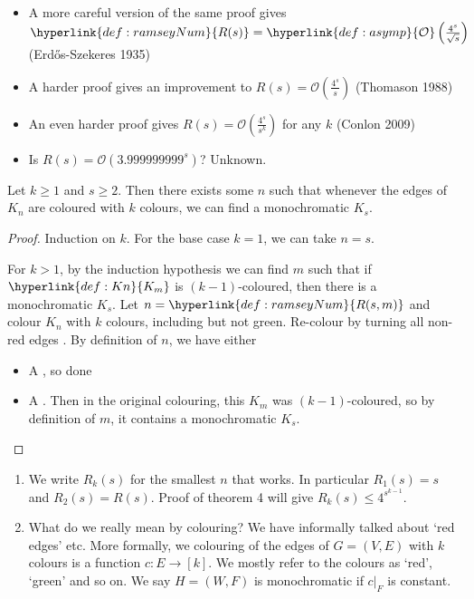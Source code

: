 \documentclass{article}
\begin{document}
\begin{remark}
    \leavevmode
    \begin{itemize}
        \item A more careful version of the same proof gives $\hyperlink{def:ramseyNum}{R(s)} = \hyperlink{def:asymp}{\mathcal{O}} \left(\frac{4^s}{\sqrt{s}}\right)$ (Erd\H{o}s-Szekeres 1935)
        \item A harder proof gives an improvement to $R(s) = \mathcal{O}\left(\frac{4^s}{s}\right)$ (Thomason 1988)
        \item An even harder proof gives $R(s) = \mathcal{O}\left(\frac{4^s}{s^k}\right)$ for any $k$ (Conlon 2009)
        \item Is $R(s) = \mathcal{O}\left(3.999999999^s\right)$? Unknown.
    \end{itemize}
\end{remark}

\begin{nthm}\label{thm:multiRamsey}
    Let $k \geq 1$ and $s \geq 2$.
    Then there exists some $n$ such that whenever the edges of \hyperlink{def:Kn}{$K_n$} are coloured with $k$ colours, we can find a monochromatic $K_s$.
\end{nthm}

\begin{proof}
    Induction on $k$. For the base case $k=1$, we can take $n=s$.

    For $k>1$, by the induction hypothesis we can find $m$ such that if $\hyperlink{def:Kn}{K_m}$ is $(k-1)$-coloured, then there is a monochromatic $K_s$.
    Let $n = \hyperlink{def:ramseyNum}{R(s, m)}$ and colour $K_n$ with $k$ colours, including  but not green.
    Re-colour by turning all non-red edges .
    By definition of $n$, we have either
    \begin{itemize}
        \item A , so done
        \item A . Then in the original colouring, this $K_m$ was $(k-1)$-coloured, so by definition of $m$, it contains a monochromatic $K_s$. \qedhere
    \end{itemize}
\end{proof}

\begin{remark} \leavevmode
    \begin{enumerate}[label=\arabic*.]
        \item We write $R_k(s)$ for the smallest $n$ that works. In particular $R_1(s) = s$ and $R_2(s) = R(s)$.
            Proof of theorem 4 will give $R_k(s) \leq 4^{s^{k-1}}$.
        \item What do we really mean by colouring?
            We have informally talked about `red edges' etc. More formally, we colouring of the edges of $G = (V, E)$ with $k$ colours is a function $c: E \to [k]$. We mostly refer to the colours as `red', `green' and so on.
            We say $H = (W, F)$ is monochromatic if $c |_F$ is constant.
    \end{enumerate}
\end{remark}
\end{document}
